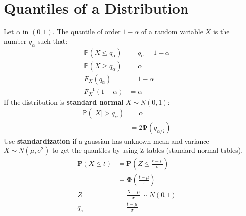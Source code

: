 \section{Quantiles of a Distribution}

Let $\alpha$ in $(0,1)$. The quantile of order $1 - \alpha$ of a random variable $X$ is the number $q_{\alpha}$ such that:\\
\begin{align*}
\displaystyle \mathbb{P}\left(X\leq q_{\alpha }\right)& = q_{\alpha } = 1-\alpha\\
\mathbb{P}(X \geq q_{\alpha })& = \alpha\\
F_X(q_{\alpha})& = 1 - \alpha\\
F^{-1}_{X}(1-\alpha)&= \alpha
\end{align*}
If the distribution is \textbf{standard normal} $X \sim N(0,1)$:\\
\begin{align*}
\mathbb{P}(|X| > q_{\alpha})& = \alpha\\
& = 2\mathbf{\Phi}(q_{\alpha/2})
\end{align*}
Use \textbf{standardization} if a gaussian has unknown mean and variance $X \sim N(\mu,\sigma^2)$ to get the quantiles by using Z-tables (standard normal tables).\\
\begin{align*}
\mathbf{P}\left(X\leq t\right)& = \displaystyle \mathbf{P}\left(Z\leq \frac{t-\mu}{\sigma}\right)\\
& = \mathbf{\Phi}\left(\frac{t-\mu}{\sigma}\right)\\
Z &= \frac{X-\mu}{\sigma} \sim N(0,1)\\
q_{\alpha }& = \frac{t-\mu}{\sigma}
\end{align*}